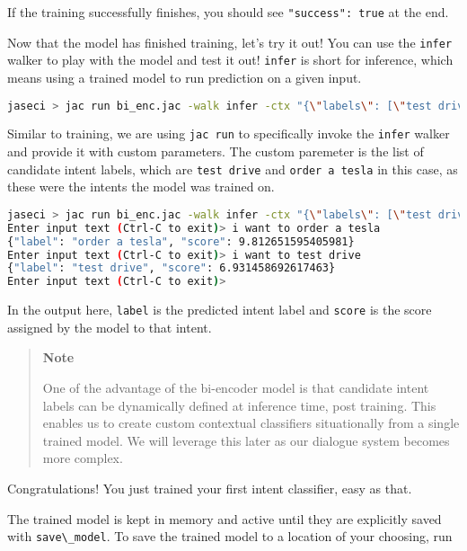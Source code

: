 If the training successfully finishes, you should see
\passthrough{\lstinline!"success": true!} at the end.

Now that the model has finished training, let's try it out! You can use
the \passthrough{\lstinline!infer!} walker to play with the model and
test it out! \passthrough{\lstinline!infer!} is short for inference,
which means using a trained model to run prediction on a given input.

\begin{lstlisting}[language=bash]
jaseci > jac run bi_enc.jac -walk infer -ctx "{\"labels\": [\"test drive\", \"order a tesla\"]}"
\end{lstlisting}

Similar to training, we are using \passthrough{\lstinline!jac run!} to
specifically invoke the \passthrough{\lstinline!infer!} walker and
provide it with custom parameters. The custom paremeter is the list of
candidate intent labels, which are \passthrough{\lstinline!test drive!}
and \passthrough{\lstinline!order a tesla!} in this case, as these were
the intents the model was trained on.

\begin{lstlisting}[language=bash]
jaseci > jac run bi_enc.jac -walk infer -ctx "{\"labels\": [\"test drive\", \"order a tesla\"]}"
Enter input text (Ctrl-C to exit)> i want to order a tesla
{"label": "order a tesla", "score": 9.812651595405981}
Enter input text (Ctrl-C to exit)> i want to test drive
{"label": "test drive", "score": 6.931458692617463}
Enter input text (Ctrl-C to exit)>
\end{lstlisting}

In the output here, \passthrough{\lstinline!label!} is the predicted
intent label and \passthrough{\lstinline!score!} is the score assigned
by the model to that intent.

\begin{quote}
\textbf{Note}

One of the advantage of the bi-encoder model is that candidate intent
labels can be dynamically defined at inference time, post training. This
enables us to create custom contextual classifiers situationally from a
single trained model. We will leverage this later as our dialogue system
becomes more complex.
\end{quote}

Congratulations! You just trained your first intent classifier, easy as
that.

The trained model is kept in memory and active until they are explicitly
saved with \passthrough{\lstinline!save\_model!}. To save the trained
model to a location of your choosing, run

